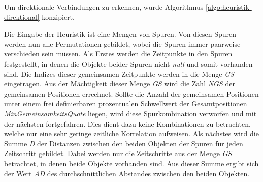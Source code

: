 Um direktionale Verbindungen zu erkennen, wurde Algorithmus \vref{algo:heuristik-direktional} konzipiert.

Die Eingabe der Heuristik ist eine Mengen von Spuren.
Von diesen Spuren werden nun alle Permutationen gebildet, wobei die Spuren immer paarweise verschieden sein müssen.
Als Erstes werden die Zeitpunkte in den Spuren festgestellt, in denen die Objekte beider Spuren nicht \textit{null} und somit vorhanden sind.
Die Indizes dieser gemeinsamen Zeitpunkte werden in die Menge \textit{GS} eingetragen.
Aus der Mächtigkeit dieser Menge \textit{GS} wird die Zahl \textit{NGS} der gemeinsamen Positionen errechnet.
Sollte die Anzahl der gemeinsamen Positionen unter einem frei definierbaren prozentualen Schwellwert der Gesamtpositionen \textit{MinGemeinsamkeitsQuote} liegen, wird diese Spurkombination verworfen und mit der nächsten fortgefahren.
Dies dient dazu keine Kombinationen zu betrachten, welche nur eine sehr geringe zeitliche Korrelation aufweisen.
Als nächstes wird die Summe \textit{D} der Distanzen zwischen den beiden Objekten der Spuren für jeden Zeitschritt gebildet.
Dabei werden nur die Zeitschritte aus der Menge \textit{GS} betrachtet, in denen beide Objekte vorhanden sind.
Aus dieser Summe ergibt sich der Wert \textit{AD} des durchschnittlichen Abstandes zwischen den beiden Objekten.

